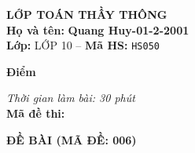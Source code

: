 \noindent
\begin{tcolorbox}[colback=white,colframe=black,arc=0mm,boxrule=0.8pt,top=4pt,bottom=4pt,left=6pt,right=6pt]
	\begin{minipage}[c]{0.44\textwidth}
		{\bfseries\large LỚP TOÁN THẦY THÔNG}\\[3pt]
		\textbf{Họ và tên:} \textbf{\large Quang Huy-01-2-2001}\\[3pt]
		\textbf{Lớp:} LỚP 10 \quad -- \quad \textbf{Mã HS:} \texttt{HS050}
	\end{minipage}
	\hfill
	\begin{minipage}[c]{0.22\textwidth}
		\begin{tcolorbox}[colback=white,colframe=black,arc=0mm,boxrule=0.6pt,height=1.8cm,halign=center,valign=top,top=2pt]
			{\bfseries\normalsize Điểm}
		\end{tcolorbox}
	\end{minipage}
	\hfill
	\begin{minipage}[c]{0.30\textwidth}
		\raggedleft
		\textit{Thời gian làm bài: 30 phút}\\[4pt]
		\textbf{Mã đề thi:} 
	\end{minipage}
\end{tcolorbox}
\vspace{0.25cm}

\noindent\textbf{\large ĐỀ BÀI (MÃ ĐỀ: 006)}
\vspace{0.1cm}

